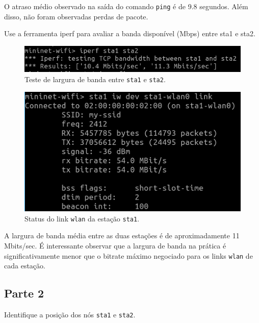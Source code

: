 \documentclass{article}
\begin{document}
O atraso médio observado na saída do comando \texttt{ping} é de 9.8 segundos.
Além disso, não foram observadas perdas de pacote.

\begin{tcolorbox}
    Use a ferramenta iperf para avaliar a banda disponível (Mbps)
    entre sta1 e sta2.
\end{tcolorbox}

\begin{figure}[!htb]
\centering
\includegraphics[width=\columnwidth]{images/p1_iperf.png}
\caption{Teste de largura de banda entre \texttt{sta1} e \texttt{sta2}.}
\end{figure}

\begin{figure}[!htb]
\centering
\includegraphics[width=\columnwidth]{images/p1_iwconfig.png}
\caption{Status do link \texttt{wlan} da estação \texttt{sta1}.}
\end{figure}

A largura de banda média entre as duas estações é de aproximadamente 11 Mbits/sec.
É interessante observar que a largura de banda na prática é significativamente menor que o
bitrate máximo negociado para os links \texttt{wlan} de cada estação.


\subsection*{Parte 2}

\begin{tcolorbox}
    Identifique a posição dos nós \texttt{sta1} e \texttt{sta2}.
\end{tcolorbox}
\end{document}
